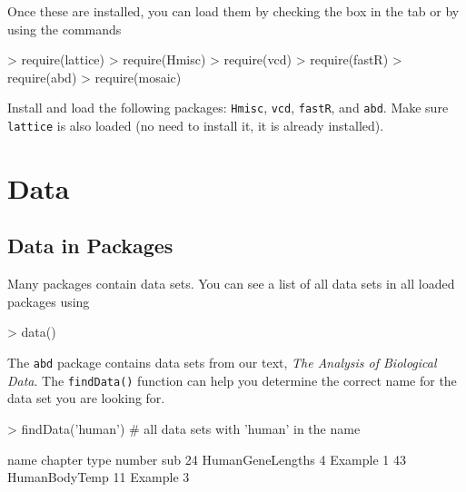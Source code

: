Once these are installed, you can load them by checking the box in the 
 tab or by using the commands

\begin{Schunk}
\begin{Sinput}
> require(lattice)
> require(Hmisc)
> require(vcd)
> require(fastR)
> require(abd)
> require(mosaic)
\end{Sinput}
\end{Schunk}

\begin{problem}
Install and load the following packages:
\verb!Hmisc!,
\verb!vcd!,
\verb!fastR!, and 
\verb!abd!.
Make sure \verb!lattice! is also loaded (no need to install it, it is already installed).
\end{problem}


\section{Data}
\subsection{Data in Packages}
Many packages contain data sets.  You can see a list of all data sets in all loaded packages
using 

\begin{Schunk}
\begin{Sinput}
> data()
\end{Sinput}
\end{Schunk}

The \verb!abd! package contains data sets from our text,
\textit{The Analysis of Biological Data}.  The \verb!findData()! function
can help you determine the correct name for the data set you are looking
for.

\begin{Schunk}
\begin{Sinput}
> findData('human')         # all data sets with 'human' in the name
\end{Sinput}
\begin{Soutput}
               name chapter    type number sub
24 HumanGeneLengths       4 Example      1    
43    HumanBodyTemp      11 Example      3    
\end{Soutput}
\end{Schunk}

